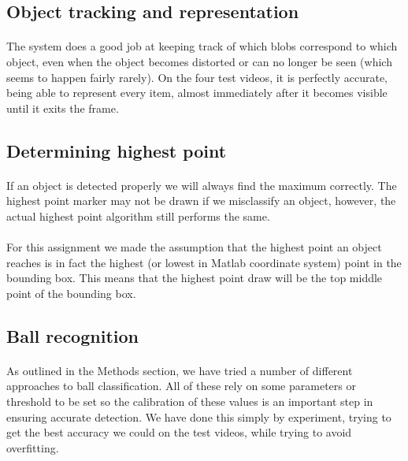 \documentclass[10pt,a4paper]{article}
\begin{document}
\subsection{Object tracking and representation}

\paragraph{} The system does a good job at keeping track of which blobs correspond to which object, even when the object becomes distorted or can no longer be seen (which seems to happen fairly rarely). On the four test videos, it is perfectly accurate, being able to represent every item, almost immediately after it becomes visible until it exits the frame.

\subsection{Determining highest point}

\paragraph{} If an object is detected properly we will always find the maximum correctly. The highest point marker may not be drawn if we misclassify an object, however, the actual highest point algorithm still performs the same.
\paragraph{} For this assignment we made the assumption that the highest point an object reaches is in fact the highest (or lowest in Matlab coordinate system) point in the bounding box. This means that the highest point draw will be the top middle point of the bounding box.

\subsection{Ball recognition}

\paragraph{}	As outlined in the Methods section, we have tried a number of different approaches to ball classification. All of these rely on some parameters or threshold to be set so the calibration of these values is an important step in ensuring accurate detection. We have done this simply by experiment, trying to get the best accuracy we could on the test videos, while trying to avoid overfitting.
\end{document}
